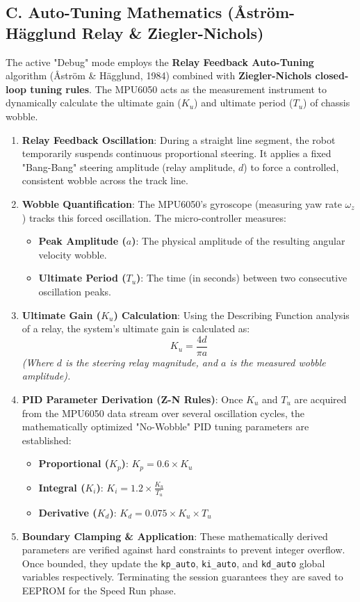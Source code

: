 \documentclass[12pt,a4paper]{article}
\begin{document}
\subsection*{C. Auto-Tuning Mathematics (\r{A}str\"{o}m-H\"{a}gglund Relay \& Ziegler-Nichols)}
The active "Debug" mode employs the \textbf{Relay Feedback Auto-Tuning} algorithm (\r{A}str\"{o}m \& H\"{a}gglund, 1984) combined with \textbf{Ziegler-Nichols closed-loop tuning rules}. The MPU6050 acts as the measurement instrument to dynamically calculate the ultimate gain ($K_u$) and ultimate period ($T_u$) of chassis wobble.

\begin{enumerate}
    \item \textbf{Relay Feedback Oscillation}: During a straight line segment, the robot temporarily suspends continuous proportional steering. It applies a fixed "Bang-Bang" steering amplitude (relay amplitude, $d$) to force a controlled, consistent wobble across the track line.
    \item \textbf{Wobble Quantification}: The MPU6050's gyroscope (measuring yaw rate $\omega_z$) tracks this forced oscillation. The micro-controller measures:
    \begin{itemize}
        \item \textbf{Peak Amplitude ($a$)}: The physical amplitude of the resulting angular velocity wobble.
        \item \textbf{Ultimate Period ($T_u$)}: The time (in seconds) between two consecutive oscillation peaks.
    \end{itemize}
    \item \textbf{Ultimate Gain ($K_u$) Calculation}: Using the Describing Function analysis of a relay, the system's ultimate gain is calculated as:
    $$K_u = \frac{4d}{\pi a}$$
    \textit{(Where $d$ is the steering relay magnitude, and $a$ is the measured wobble amplitude).}
    \item \textbf{PID Parameter Derivation (Z-N Rules)}: Once $K_u$ and $T_u$ are acquired from the MPU6050 data stream over several oscillation cycles, the mathematically optimized "No-Wobble" PID tuning parameters are established:
    \begin{itemize}
        \item \textbf{Proportional ($K_p$)}: $K_p = 0.6 \times K_u$
        \item \textbf{Integral ($K_i$)}: $K_i = 1.2 \times \frac{K_u}{T_u}$
        \item \textbf{Derivative ($K_d$)}: $K_d = 0.075 \times K_u \times T_u$
    \end{itemize}
    \item \textbf{Boundary Clamping \& Application}: These mathematically derived parameters are verified against hard constraints to prevent integer overflow. Once bounded, they update the \lstinline|kp_auto|, \lstinline|ki_auto|, and \lstinline|kd_auto| global variables respectively. Terminating the session guarantees they are saved to EEPROM for the Speed Run phase.
\end{enumerate}
\end{document}
